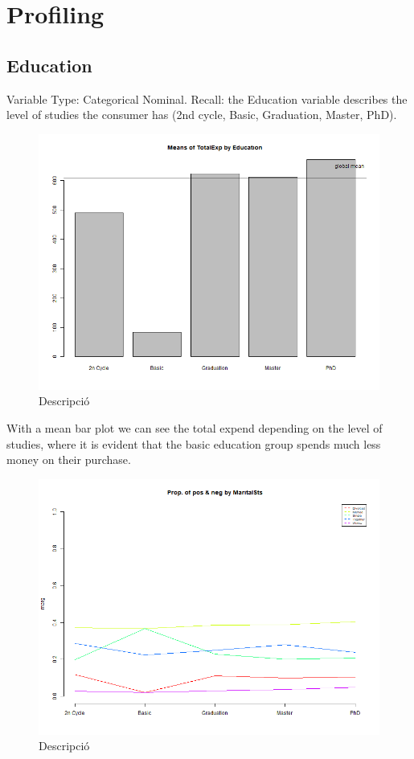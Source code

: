 \section{Profiling}

\subsection{Education}
Variable Type: Categorical Nominal. 
Recall: the Education variable describes the level of studies the consumer has (2nd cycle, Basic, Graduation, Master, PhD).

\begin{figure}[H]
    \centering
    \includegraphics[width= 1\linewidth]{Imatges/mean_barplot_TotalExp.png}
    \caption{Descripció}
    \label{fig:scree_plot_1} %
\end{figure}

With a mean bar plot we can see the total expend depending on the level of studies, where it is evident that the basic education group spends much less money on their purchase.

\begin{figure}[H]
    \centering
    \includegraphics[width= 1\linewidth]{Imatges/prop_cond_class_MaritalSts_4_legend.png}
    \caption{Descripció}
    \label{fig:scree_plot_2} %
\end{figure}

